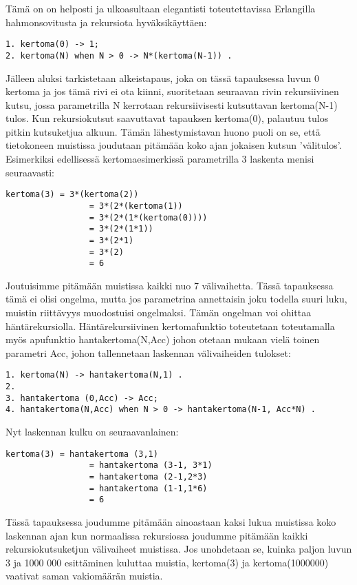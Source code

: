 \documentclass[11pt,oneside,a4paper]{article}
\begin{document}
Tämä on on helposti ja ulkoasultaan elegantisti toteutettavissa Erlangilla
hahmonsovitusta ja rekursiota hyväksikäyttäen:
\begin{verbatim}
1. kertoma(0) -> 1;
2. kertoma(N) when N > 0 -> N*(kertoma(N-1)) .
\end{verbatim}
Jälleen aluksi tarkistetaan alkeistapaus, joka on tässä tapauksessa luvun 0
kertoma ja jos tämä rivi ei ota kiinni, suoritetaan seuraavan rivin
rekursiivinen kutsu, jossa parametrilla N kerrotaan rekursiivisesti kutsuttavan
kertoma(N-1) tulos.
Kun rekursiokutsut saavuttavat tapauksen kertoma(0), palautuu tulos pitkin
kutsuketjua alkuun. Tämän lähestymistavan huono puoli on se, että tietokoneen
muistissa joudutaan pitämään koko ajan jokaisen kutsun 'välitulos'. Esimerkiksi
edellisessä 
kertomaesimerkissä parametrilla 3 laskenta menisi seuraavasti:
\begin{verbatim}
kertoma(3) = 3*(kertoma(2))
                 = 3*(2*(kertoma(1))
                 = 3*(2*(1*(kertoma(0))))
                 = 3*(2*(1*1))
                 = 3*(2*1)
                 = 3*(2)
                 = 6
\end{verbatim}
Joutuisimme pitämään muistissa kaikki nuo 7 välivaihetta. Tässä tapauksessa tämä
ei olisi ongelma, mutta jos parametrina annettaisin joku todella suuri luku,
muistin riittävyys muodostuisi ongelmaksi. 
Tämän ongelman voi ohittaa häntärekursiolla. Häntärekursiivinen kertomafunktio
toteutetaan toteutamalla myös apufunktio hantakertoma(N,Acc) johon otetaan
mukaan vielä toinen parametri Acc, johon tallennetaan laskennan 
välivaiheiden tulokset:
\begin{verbatim}
1. kertoma(N) -> hantakertoma(N,1) .
2.
3. hantakertoma (0,Acc) -> Acc;
4. hantakertoma(N,Acc) when N > 0 -> hantakertoma(N-1, Acc*N) .
\end{verbatim}

Nyt laskennan kulku on seuraavanlainen: 
\begin{verbatim}
kertoma(3) = hantakertoma (3,1)
                 = hantakertoma (3-1, 3*1)		
                 = hantakertoma (2-1,2*3)
                 = hantakertoma (1-1,1*6)
                 = 6
\end{verbatim}
Tässä tapauksessa joudumme pitämään ainoastaan kaksi lukua muistissa koko
laskennan ajan kun normaalissa rekursiossa joudumme pitämään kaikki
rekursiokutsuketjun välivaiheet muistissa. Jos unohdetaan se, kuinka paljon
luvun 3 ja 1000 000 esittäminen kuluttaa muistia, kertoma(3) ja kertoma(1000000)
vaativat saman vakiomäärän muistia. 
\end{document}

